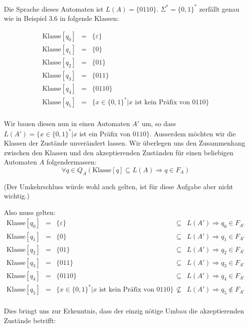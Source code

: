 \documentclass[11pt]{article} %
\theoremstyle{definition}
\begin{document}
Die Sprache dieses Automaten ist $L(A) = \{0110\}$. $\Sigma^* = \{0,1\}^*$ zerfällt genau wie in Beispiel 3.6 in folgende Klassen:

\begin{eqnarray*}
\textrm{Klasse}[q_0] &=& \{\varepsilon\} \\
\textrm{Klasse}[q_1] &=& \{0\} \\
\textrm{Klasse}[q_2] &=& \{01\} \\
\textrm{Klasse}[q_3] &=& \{011\} \\
\textrm{Klasse}[q_4] &=& \{0110\} \\
\textrm{Klasse}[q_5] &=& \{x \in \{0,1\}^* | x \textrm{ ist kein Präfix von } 0110 \} \\
\end{eqnarray*}

Wir bauen diesen nun in einen Automaten $A'$ um, so dass $L(A') = \{x \in \{0,1\}^* | x $ ist ein Präfix von $0110\}$. Ausserdem möchten wir die Klassen der Zustände unverändert lassen. Wir überlegen uns den Zusammenhang zwischen den Klassen und den akzeptierenden Zuständen für einen beliebigen Automaten $A$ folgendermassen:
\[
\forall q \in Q_A (\textrm{Klasse}[q] \subseteq L(A) \Rightarrow q \in F_A)
\]

(Der Umkehrschluss würde wohl auch gelten, ist für diese Aufgabe aber nicht wichtig.)

Also muss gelten:
\[
\begin{array}{rclcl}
\textrm{Klasse}[q_0] &=& \{\varepsilon\} &\subseteq& L(A') \Rightarrow q_0 \in F_{A'} \\
\textrm{Klasse}[q_1] &=& \{0\} &\subseteq& L(A') \Rightarrow q_1 \in F_{A'}  \\
\textrm{Klasse}[q_2] &=& \{01\} &\subseteq& L(A') \Rightarrow q_2 \in F_{A'}  \\
\textrm{Klasse}[q_3] &=& \{011\} &\subseteq& L(A') \Rightarrow q_3 \in F_{A'}  \\
\textrm{Klasse}[q_4] &=& \{0110\} &\subseteq& L(A') \Rightarrow q_4 \in F_{A'}  \\
\textrm{Klasse}[q_5] &=& \{x \in \{0,1\}^* | x \textrm{ ist kein Präfix von } 0110 \} &\not\subseteq& L(A') \Rightarrow q_5 \notin F_{A'}  \\
\end{array}
\]

Dies bringt uns zur Erkenntnis, dass der einzig nötige Umbau die akzeptierenden Zustände betrifft:
\end{document}
